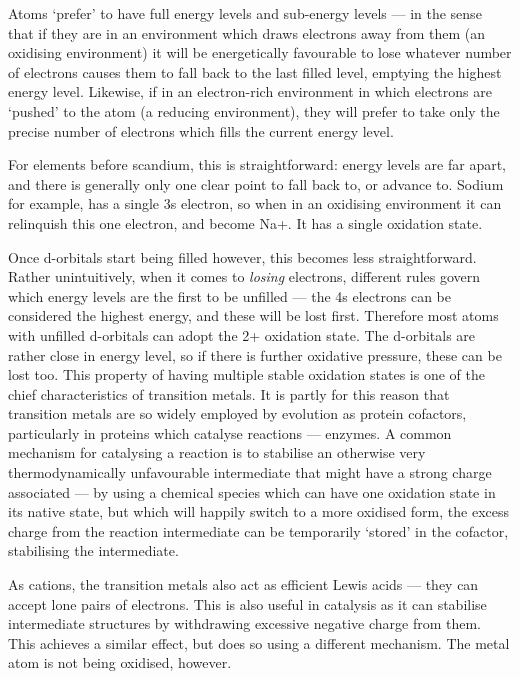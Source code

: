 Atoms `prefer' to have full energy levels and sub-energy levels --- in the sense that if they are in an environment which draws electrons away from them (an oxidising environment) it will be energetically favourable to lose whatever number of electrons causes them to fall back to the last filled level, emptying the highest energy level. Likewise, if in an electron-rich environment in which electrons are `pushed' to the atom (a reducing environment), they will prefer to take only the precise number of electrons which fills the current energy level.

For elements before scandium, this is straightforward: energy levels are far apart, and there is generally only one clear point to fall back to, or advance to. Sodium for example, has a single 3s electron, so when in an oxidising environment it can relinquish this one electron, and become Na+. It has a single oxidation state.

Once d-orbitals start being filled however, this becomes less straightforward. Rather unintuitively, when it comes to \emph{losing} electrons, different rules govern which energy levels are the first to be unfilled --- the 4s electrons can be considered the highest energy, and these will be lost first. Therefore most atoms with unfilled d-orbitals can adopt the 2+ oxidation state. The d-orbitals are rather close in energy level, so if there is further oxidative pressure, these can be lost too. This property of having multiple stable oxidation states is one of the chief characteristics of transition metals. It is partly for this reason that transition metals are so widely employed by evolution as protein cofactors, particularly in proteins which catalyse reactions --- enzymes. A common mechanism for catalysing a reaction is to stabilise an otherwise very thermodynamically unfavourable intermediate that might have a strong charge associated --- by using a chemical species which can have one oxidation state in its native state, but which will happily switch to a more oxidised form, the excess charge from the reaction intermediate can be temporarily `stored' in the cofactor, stabilising the intermediate.

As cations, the transition metals also act as efficient Lewis acids --- they can accept lone pairs of electrons. This is also useful in catalysis as it can stabilise intermediate structures by withdrawing excessive negative charge from them. This achieves a similar effect, but does so using a different mechanism. The metal atom is not being oxidised, however.

